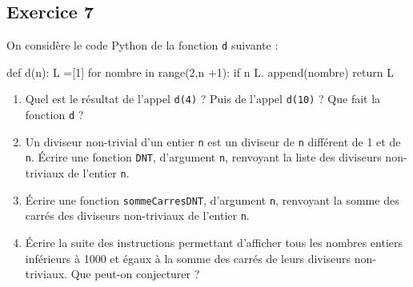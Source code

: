 \documentclass[10pt,fleqn]{article} %
\begin{document}
\begin{multicols}{2}
\subsection*{Exercice 7}

On considère le code Python de la fonction \texttt{d} suivante :

\begin{py}
\begin{python}
def d(n):
    L =[1]
    for nombre in range(2,n +1):
    if n%
        L. append(nombre)
    return L
\end{python}
\end{py}

\begin{enumerate}
\item Quel est le résultat de l’appel \texttt{d(4)} ? Puis de l’appel \texttt{d(10)} ?
Que fait la fonction \texttt{d} ?
\item Un diviseur non-trivial d’un entier \texttt{n} est un diviseur de \texttt{n} différent de 1 et de \texttt{n}. Écrire une fonction \texttt{DNT}, d’argument \texttt{n}, renvoyant la liste des diviseurs non-triviaux de l’entier \texttt{n}.
\item Écrire une fonction \texttt{sommeCarresDNT}, d’argument \texttt{n}, renvoyant la somme des carrés des diviseurs non-triviaux de l’entier \texttt{n}.
\item Écrire la suite des instructions permettant d’afficher tous les nombres entiers inférieurs à 1000 et égaux à la somme des carrés de leurs diviseurs non-triviaux. Que peut-on conjecturer ?
\end{enumerate}


\end{multicols}
\end{document}
